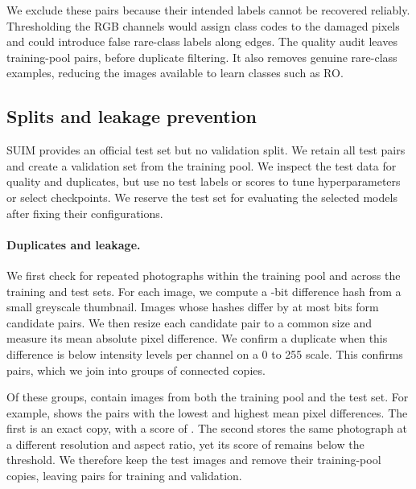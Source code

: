 We exclude these pairs because their intended labels cannot be recovered
reliably. Thresholding the RGB channels would assign class codes to the damaged
pixels and could introduce false rare-class labels along edges. The quality
audit leaves \suimQualityPassed{} training-pool pairs, before duplicate
filtering. It also removes genuine rare-class examples, reducing the images
available to learn classes such as RO.


\subsection{Splits and leakage prevention}
\label{sec:splits}
SUIM provides an official test set but no validation split. We retain all
\suimTestUsable{} test pairs and create a validation set from the training
pool. We inspect the test data for quality and duplicates, but use no test
labels or scores to tune hyperparameters or select checkpoints. We reserve the
test set for evaluating the selected models after fixing their configurations.

\paragraph{Duplicates and leakage.}
We first check for repeated photographs within the training pool and across
the training and test sets. For each image, we compute a
\suimHashBits-bit difference hash from a small greyscale thumbnail. Images
whose hashes differ by at most \suimHashDistance{} bits form
\suimHashCandidates{} candidate pairs. We then resize each candidate pair to
a common size and measure its mean absolute pixel difference. We confirm a
duplicate when this difference is below \suimPixelTolerance{} intensity levels
per channel on a 0 to 255 scale. This confirms \suimConfirmedPairs{} pairs,
which we join into \suimDuplicateGroups{} groups of connected copies.

Of these groups, \suimCrossSplitGroups{} contain images from both the training
pool and the test set. For example,  shows the
pairs with the lowest and highest mean pixel differences. The first is an
exact copy, with a score of \suimDuplicateScoreLowest{}. The second stores the
same photograph at a different resolution and aspect ratio, yet its score of
\suimDuplicateScoreHighest{} remains below the \suimPixelTolerance{} threshold.
We therefore keep the test images and remove their
\suimTestDuplicatesDropped{} training-pool copies, leaving
\suimTrainValUsable{} pairs for training and validation.

